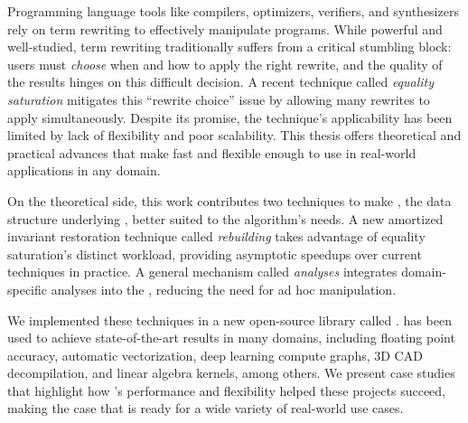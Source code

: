 
Programming language tools like
 compilers, optimizers, verifiers, and synthesizers
 rely on term rewriting to effectively manipulate programs.
While powerful and well-studied,
 term rewriting traditionally suffers from a critical stumbling block:
 users must \textit{choose} when and how to apply the right rewrite,
 and the quality of the results hinges on this difficult decision.
A recent technique called \textit{equality saturation}
 mitigates this ``rewrite choice'' issue
 by allowing many rewrites to apply simultaneously.
Despite its promise, the technique's applicability has been limited by
 lack of flexibility and poor scalability.
This thesis offers theoretical and practical advances that make
 \eqsat fast and flexible enough
 to use in real-world applications in any domain.

On the theoretical side,
 this work contributes two techniques
 to make \egraphs, the data structure underlying \eqsat,
 better suited to the algorithm's needs.
A new amortized invariant restoration technique called \textit{rebuilding}
  takes advantage of equality saturation's distinct workload,
  providing asymptotic speedups over current techniques in practice.
A general mechanism called \textit{\eclass analyses}
  integrates domain-specific analyses into the \egraph,
  reducing the need for ad hoc manipulation.

We implemented these techniques in
  a new open-source library called \egg.
\egg has been used to achieve state-of-the-art
 results in many domains, including
  floating point accuracy,
  automatic vectorization,
  deep learning compute graphs,
  3D CAD decompilation,
  and
  linear algebra kernels,
  among others.
We present case studies
  that highlight how \egg's performance and flexibility
  helped these projects succeed,
  making the case that \eqsat is ready for
  a wide variety of real-world use cases.

